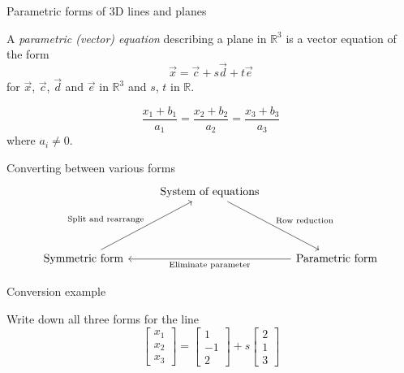\documentclass{beamer}
\begin{document}
\begin{frame}{Parametric forms of 3D lines and planes}
  \begin{definition}
    A \emph{parametric (vector) equation} describing a plane in $\mathbb R^3$ is a vector equation of the form
    \begin{equation*}
      \vec{x} = \vec{c}+s\vec{d}+t\vec{e}
    \end{equation*}
    for $\vec{x}$, $\vec{c}$, $\vec{d}$ and $\vec{e}$ in $\mathbb R^3$ and $s$, $t$ in $\mathbb R$.
  \end{definition}\vfill
  \begin{definition}
    \begin{equation*}
      \frac{x_1+b_1}{a_1} = \frac{x_2+b_2}{a_2} =\frac{x_3+b_3}{a_3}
    \end{equation*}
    where $a_i\neq 0$.
  \end{definition}
\end{frame}

\begin{frame}[fragile]{Converting between various forms}
  \begin{equation*}
    \begin{tikzcd}
      {}&\text{System of equations} \arrow{ddr}{\text{Row reduction}} &{}\\
      {}&{}&{}\\
      \text{Symmetric form} \arrow{uur}{\text{Split and rearrange}} &{} & \text{Parametric form} \arrow{ll}{\text{Eliminate parameter}}
    \end{tikzcd}
  \end{equation*}
\end{frame}

\begin{frame}{Conversion example}
    \begin{example}
    Write down all three forms for the line
    \begin{equation*}
      \left[
	\begin{array}{c}
          x_1\\
          x_2\\
          x_3
	\end{array}
      \right] = \left[
	\begin{array}{c}
          1\\
          -1\\
          2
	\end{array}
      \right]+s \left[
	\begin{array}{c}
          2\\
          1\\
          3
	\end{array}
      \right]
    \end{equation*}
  \end{example}
\end{frame}
\end{document}
